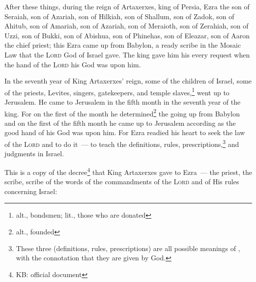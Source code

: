 
\begin{inparaenum}
     After these things, during the reign of Artaxerxes, king of Persia, Ezra the son of Seraiah, son of Azariah, son of Hilkiah,%
     son of Shallum, son of Zadok, son of Ahitub,%
     son of Amariah, son of Azariah, son of Meraioth,%
     son of Zerahiah, son of Uzzi, son of Bukki,%
     son of Abishua, son of Phinehas, son of Eleazar, son of Aaron the chief priest;%
     this Ezra came up from Babylon, a ready scribe in the Mosaic Law that the \textsc{Lord} God of Israel gave. The king gave him his every request when the hand of the \textsc{Lord} his God was upon him.%
    
     In the seventh year of King Artaxerxes' reign, some of the children of Israel, some of the priests, Levites, singers, gatekeepers, and temple slaves,\footnote{alt., bondsmen; lit., those who are donated} went up to Jerusalem.%
     He came to Jerusalem in the fifth month in the seventh year of the king.%
     For on the first of the month he determined\footnote{alt., founded} the going up from Babylon and on the first of the fifth month he came up to Jerusalem according as the good hand of his God was upon him.%
     For Ezra readied his heart to seek the law of the \textsc{Lord} and to do it~--- to teach the definitions, rules, prescriptions,\footnote{These three (definitions, rules, prescriptions) are all possible meanings of , with the connotation that they are given by God.} and judgments in Israel.%
    
     This is a copy of the decree\footnote{KB: official document} that King Artaxerxes gave to Ezra~--- the priest, the scribe, scribe of the words of the commandments of the \textsc{Lord} and of His rules concerning Israel:%
\end{inparaenum}

